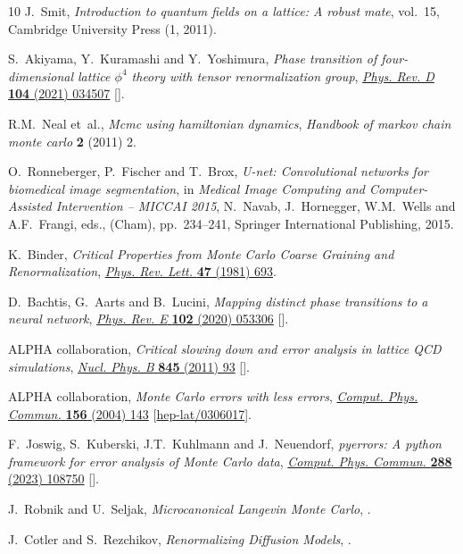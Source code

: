 \begin{thebibliography}{10}
J.~Smit, \emph{{Introduction to quantum fields on a lattice: A robust mate}},
  vol.~15, Cambridge University Press (1, 2011).

S.~Akiyama, Y.~Kuramashi and Y.~Yoshimura, \emph{{Phase transition of
  four-dimensional lattice ${\phi}^4$ theory with tensor renormalization
  group}}, \href{https://doi.org/10.1103/PhysRevD.104.034507}{\emph{Phys. Rev.
  D} {\bfseries 104} (2021) 034507}
  [\href{https://arxiv.org/abs/2101.06953}{{}}].

R.M.~Neal et~al., \emph{Mcmc using hamiltonian dynamics}, {\emph{Handbook of
  markov chain monte carlo} {\bfseries 2} (2011) 2}.

O.~Ronneberger, P.~Fischer and T.~Brox, \emph{U-net: Convolutional networks for
  biomedical image segmentation},  in \emph{Medical Image Computing and
  Computer-Assisted Intervention -- MICCAI 2015}, N.~Navab, J.~Hornegger,
  W.M.~Wells and A.F.~Frangi, eds., (Cham), pp.~234--241, Springer
  International Publishing, 2015.

K.~Binder, \emph{{Critical Properties from Monte Carlo Coarse Graining and
  Renormalization}},
  \href{https://doi.org/10.1103/PhysRevLett.47.693}{\emph{Phys. Rev. Lett.}
  {\bfseries 47} (1981) 693}.

D.~Bachtis, G.~Aarts and B.~Lucini, \emph{{Mapping distinct phase transitions
  to a neural network}},
  \href{https://doi.org/10.1103/PhysRevE.102.053306}{\emph{Phys. Rev. E}
  {\bfseries 102} (2020) 053306}
  [\href{https://arxiv.org/abs/2007.00355}{{}}].

{\scshape ALPHA} collaboration, \emph{{Critical slowing down and error analysis
  in lattice QCD simulations}},
  \href{https://doi.org/10.1016/j.nuclphysb.2010.11.020}{\emph{Nucl. Phys. B}
  {\bfseries 845} (2011) 93} [\href{https://arxiv.org/abs/1009.5228}{{}}].

{\scshape ALPHA} collaboration, \emph{{Monte Carlo errors with less errors}},
  \href{https://doi.org/10.1016/S0010-4655(03)00467-3}{\emph{Comput. Phys.
  Commun.} {\bfseries 156} (2004) 143}
  [\href{https://arxiv.org/abs/hep-lat/0306017}{{\ttfamily hep-lat/0306017}}].

F.~Joswig, S.~Kuberski, J.T.~Kuhlmann and J.~Neuendorf, \emph{{pyerrors: A
  python framework for error analysis of Monte Carlo data}},
  \href{https://doi.org/10.1016/j.cpc.2023.108750}{\emph{Comput. Phys. Commun.}
  {\bfseries 288} (2023) 108750}
  [\href{https://arxiv.org/abs/2209.14371}{{}}].

J.~Robnik and U.~Seljak, \emph{{Microcanonical Langevin Monte Carlo}},
  \href{https://arxiv.org/abs/2303.18221}{{}}.

J.~Cotler and S.~Rezchikov, \emph{{Renormalizing Diffusion Models}},
  \href{https://arxiv.org/abs/2308.12355}{{}}.

\end{thebibliography}\endgroup
